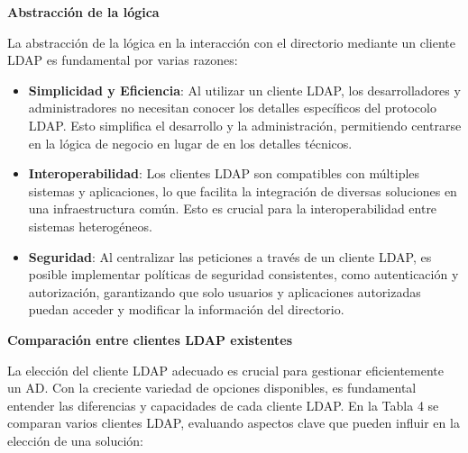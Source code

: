 \textbf{Abstracción de la lógica}

La abstracción de la lógica en la interacción con el directorio mediante un cliente LDAP es fundamental por varias razones:

\begin{itemize}
    \item \textbf{Simplicidad y Eficiencia}: Al utilizar un cliente LDAP, los desarrolladores y administradores no necesitan conocer los detalles específicos del protocolo LDAP. Esto simplifica el desarrollo y la administración, permitiendo centrarse en la lógica de negocio en lugar de en los detalles técnicos.
    \item \textbf{Interoperabilidad}: Los clientes LDAP son compatibles con múltiples sistemas y aplicaciones, lo que facilita la integración de diversas soluciones en una infraestructura común. Esto es crucial para la interoperabilidad entre sistemas heterogéneos.
    \item \textbf{Seguridad}: Al centralizar las peticiones a través de un cliente LDAP, es posible implementar políticas de seguridad consistentes, como autenticación y autorización, garantizando que solo usuarios y aplicaciones autorizadas puedan acceder y modificar la información del directorio.
\end{itemize}

\textbf{Comparación entre clientes LDAP existentes}

La elección del cliente LDAP adecuado es crucial para gestionar eficientemente un AD. Con la creciente variedad de opciones disponibles, es fundamental entender las diferencias y capacidades de cada cliente LDAP.
En la Tabla 4 se comparan varios clientes LDAP, evaluando aspectos clave que pueden influir en la elección de una solución:

